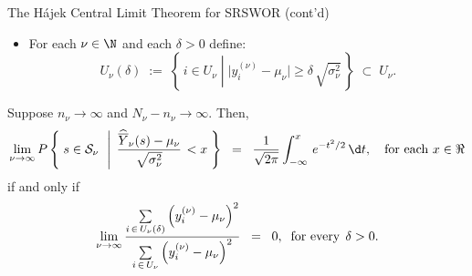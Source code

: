 \begin{frame}{\large The H\'ajek Central Limit Theorem for SRSWOR (cont'd)}

{\tiny
\begin{itemize}
\item	For each $\nu \in \N$ and each $\delta > 0$ define:
\begin{equation*}
U_{\nu}(\delta) \;:=\; \left\{\,i \in U_{\nu}\;\left\vert\; \vert y^{(\nu)}_{i} - \mu_{\nu} \vert \geq \delta \, \sqrt{\sigma_{\nu}^{2}} \right.\,\right\}
\; \subset \; U_{\nu}.
\end{equation*}
\end{itemize}
}
\scriptsize
Suppose $n_{\nu} \longrightarrow \infty$ and $N_{\nu} - n_{\nu} \longrightarrow \infty$.
Then,
\begin{equation*}
\lim_{\nu \rightarrow \infty}
P\left\{\;s \in \mathcal{S}_{\nu} \;\,\left\vert\;\,\dfrac{\widehat{\overline{Y}}_{\nu}(s) - \mu_{\nu}}{\sqrt{\sigma_{\nu}^{2}}}\right. < x \;\right\}
\;\;=\;\;
\dfrac{1}{\sqrt{2\pi}}
\int_{-\infty}^{x}\,e^{-t^{2}/2}\,\d t,
\quad
\textnormal{for each $x \in \Re$}
\end{equation*}
if and only if
\small
\begin{equation*}
\lim_{\nu\rightarrow\infty}
\dfrac{
\underset{i\,\in\,U_{\nu}(\delta)}{\sum}\left(y^{(\nu)}_{i} - \mu_{\nu}\right)^{2}
}{
\underset{i\,\in\,U_{\nu}}{\sum}\left(y^{(\nu)}_{i} - \mu_{\nu}\right)^{2}
}\;\; = \;\; 0,
\;\;\textnormal{for every}\;\, \delta > 0.
\end{equation*}

\end{frame}
\normalsize
